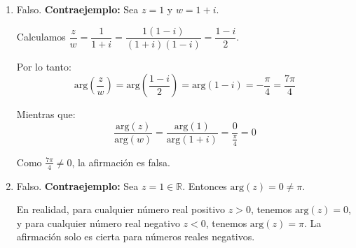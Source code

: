 \begin{prob}
\begin{myproof}
\begin{enumerate}[$a)$]
\item Falso. \textbf{Contraejemplo:} 
Sea $z=1$ y $w=1+i$. 

Calculamos $\dfrac{z}{w} = \dfrac{1}{1+i} = \dfrac{1(1-i)}{(1+i)(1-i)} = \dfrac{1-i}{2}$.

Por lo tanto:
$$\text{arg}\left(\dfrac{z}{w}\right) = \text{arg}\left(\dfrac{1-i}{2}\right) = \text{arg}(1-i) = -\frac{\pi}{4} = \frac{7\pi}{4}$$

Mientras que:
$$\dfrac{\text{arg}(z)}{\text{arg}(w)} = \dfrac{\text{arg}(1)}{\text{arg}(1+i)} = \dfrac{0}{\frac{\pi}{4}} = 0$$

Como $\frac{7\pi}{4} \neq 0$, la afirmación es falsa.

\item Falso. \textbf{Contraejemplo:} 
Sea $z=1 \in \mathbb{R}$. Entonces $\text{arg}(z) = 0 \neq \pi$. 

En realidad, para cualquier número real positivo $z > 0$, tenemos $\text{arg}(z) = 0$, y para cualquier número real negativo $z < 0$, tenemos $\text{arg}(z) = \pi$. La afirmación solo es cierta para números reales negativos.
\end{enumerate}
\end{myproof}
\end{prob}

